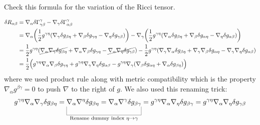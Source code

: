 \documentclass[10pt]{article}
\begin{document}
\begin{example}\label{b3e26}
	Check this formula for the variation of the Ricci tensor.
\end{example}
\sol 
$$
\begin{aligned}
	\delta R_{\alpha\beta} &= \nabla_\alpha\delta\Gamma_{\gamma\beta}^\gamma - \nabla_\gamma\delta\Gamma_{\alpha\beta}^\gamma\\
	&= \nabla_\alpha\p*{\frac12 g^{\gamma\eta}(\nabla_\gamma \delta g_{\beta\eta} + \nabla_\beta \delta g_{\gamma\eta} - \nabla_\eta \delta g_{\gamma\beta})}
	- \nabla_\gamma\p*{\frac12 g^{\gamma\eta}(\nabla_\alpha \delta g_{\beta\eta} + \nabla_\beta \delta g_{\alpha\eta} - \nabla_\eta \delta g_{\alpha\beta})}\\
	&= \frac12 g^{\gamma\eta}(\cancel{\nabla_\alpha\nabla_\gamma \delta g_{\beta\eta}} + \nabla_\alpha\nabla_\beta \delta g_{\gamma\eta} - \cancel{\nabla_\alpha\nabla_\eta \delta g_{\gamma\beta}})
	- \frac12 g^{\gamma\eta}(\nabla_\gamma\nabla_\alpha \delta g_{\beta\eta} + \nabla_\gamma\nabla_\beta \delta g_{\alpha\eta} - \nabla_\gamma\nabla_\eta \delta g_{\alpha\beta})\\
	&= \frac12 \pl{g^{\gamma\eta} \nabla_\alpha\nabla_\beta \delta g_{\gamma\eta}+ g^{\gamma\eta} \nabla_\gamma\nabla_\eta \delta g_{\alpha\beta} - g^{\gamma\eta}\nabla_\gamma(\nabla_\beta\delta g_{\alpha\eta}+\nabla_\alpha\delta g_{\beta\eta})}\\
\end{aligned}
$$
where we used product rule along with metric compatibility which is the property $\nabla_\alpha g^{\beta\gamma}=0$ to push $\nabla$ to the right of $g$. We also used this renaming trick:
$$
g^{\gamma\eta}\nabla_\alpha\nabla_\gamma \delta g_{\beta\eta} = \ub{\nabla_\alpha\nabla^\eta \delta g_{\beta\eta} = \nabla_\alpha\nabla^\gamma \delta g_{\beta\gamma}}{\text{Rename dummy index }\eta\to\gamma} = g^{\gamma\eta}\nabla_\alpha\nabla_\eta \delta g_{\beta\gamma} = g^{\gamma\eta}\nabla_\alpha\nabla_\eta \delta g_{\gamma\beta}
$$
\end{document}
